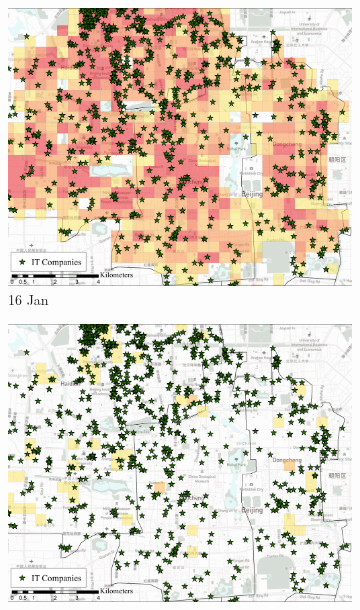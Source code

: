 \documentclass[preprints,article,accept,moreauthors,pdftex]{Definitions/mdpi}
\begin{document}
\begin{figure}[H]
    \centering
    \begin{subfigure}{.32\textwidth}
        \includegraphics[width=\textwidth]{Figures/Relation_with_POIs/POIsITD2020_01_16.pdf}
        \caption{16 Jan}
    \end{subfigure}
    \begin{subfigure}{.32\textwidth}
        \includegraphics[width=\textwidth]{Figures/Relation_with_POIs/POIsITD2020_02_15.pdf}

\end{subfigure}
\end{figure}
\end{document}
